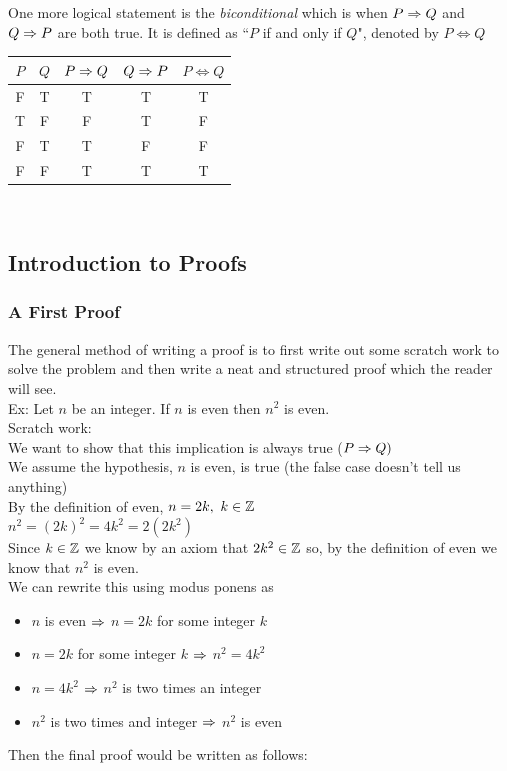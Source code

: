 \documentclass[11pt, fleqn]{article}
\begin{document}
One more logical statement is the \textit{biconditional} which is when $P\Rightarrow Q$ and $Q\Rightarrow P$ are both true. It is defined as ``$P$ if and only if $Q$", denoted by $P\Leftrightarrow Q$\\
\begin{tabular}{c|c||c|c|c}
    $P$ & $Q$ & $P\Rightarrow Q$ & $Q\Rightarrow P$ & $P\Leftrightarrow Q$\\
    \hline
    F & T & T & T & T\\
    T & F & F & T & F\\
    F & T & T & F & F\\
    F & F & T & T & T
\end{tabular}\\


\subsection{Introduction to Proofs}
\subsubsection{A First Proof}
The general method of writing a proof is to first write out some scratch work to solve the problem and then write a neat and structured proof which the reader will see.\\
Ex: Let $n$ be an integer. If $n$ is even then $n^2$ is even.\\
Scratch work:\\
We want to show that this implication is always true ($P\Rightarrow Q)$\\
We assume the hypothesis, $n$ is even, is true (the false case doesn't tell us anything)\\
By the definition of even, $n=2k,\ k\in\Z$\\
$n^2=(2k)^2=4k^2=2(2k^2)$\\
Since $k\in\mathbb{Z}$ we know by an axiom that $2k^2\in\mathbb{Z}$ so, by the definition of even we know that $n^2$ is even.\\
We can rewrite this using modus ponens as
\begin{itemize}
    \item $n$ is even $\Rightarrow$ $n=2k$ for some integer $k$
    \item $n=2k$ for some integer $k$ $\Rightarrow$ $n^2=4k^2$
    \item $n=4k^2$ $\Rightarrow$ $n^2$ is two times an integer
    \item $n^2$ is two times and integer $\Rightarrow$ $n^2$ is even
\end{itemize}
Then the final proof would be written as follows:\\
\end{document}

